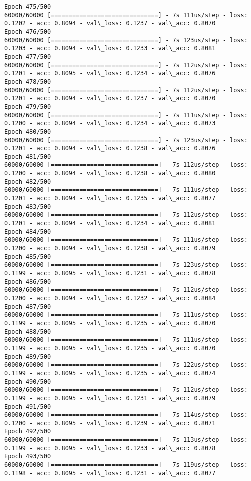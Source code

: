 \documentclass[11pt]{article}
\begin{document}
\begin{Verbatim}[commandchars=\\\{\}]
Epoch 475/500
60000/60000 [==============================] - 7s 111us/step - loss: 0.1202 - acc: 0.8094 - val\_loss: 0.1237 - val\_acc: 0.8070
Epoch 476/500
60000/60000 [==============================] - 7s 123us/step - loss: 0.1203 - acc: 0.8094 - val\_loss: 0.1233 - val\_acc: 0.8081
Epoch 477/500
60000/60000 [==============================] - 7s 112us/step - loss: 0.1201 - acc: 0.8095 - val\_loss: 0.1234 - val\_acc: 0.8076
Epoch 478/500
60000/60000 [==============================] - 7s 112us/step - loss: 0.1201 - acc: 0.8094 - val\_loss: 0.1237 - val\_acc: 0.8070
Epoch 479/500
60000/60000 [==============================] - 7s 111us/step - loss: 0.1200 - acc: 0.8094 - val\_loss: 0.1234 - val\_acc: 0.8073
Epoch 480/500
60000/60000 [==============================] - 7s 123us/step - loss: 0.1201 - acc: 0.8094 - val\_loss: 0.1238 - val\_acc: 0.8076
Epoch 481/500
60000/60000 [==============================] - 7s 112us/step - loss: 0.1200 - acc: 0.8094 - val\_loss: 0.1238 - val\_acc: 0.8080
Epoch 482/500
60000/60000 [==============================] - 7s 111us/step - loss: 0.1201 - acc: 0.8094 - val\_loss: 0.1235 - val\_acc: 0.8077
Epoch 483/500
60000/60000 [==============================] - 7s 112us/step - loss: 0.1201 - acc: 0.8094 - val\_loss: 0.1234 - val\_acc: 0.8081
Epoch 484/500
60000/60000 [==============================] - 7s 111us/step - loss: 0.1200 - acc: 0.8094 - val\_loss: 0.1238 - val\_acc: 0.8079
Epoch 485/500
60000/60000 [==============================] - 7s 123us/step - loss: 0.1199 - acc: 0.8095 - val\_loss: 0.1231 - val\_acc: 0.8078
Epoch 486/500
60000/60000 [==============================] - 7s 112us/step - loss: 0.1200 - acc: 0.8094 - val\_loss: 0.1232 - val\_acc: 0.8084
Epoch 487/500
60000/60000 [==============================] - 7s 111us/step - loss: 0.1199 - acc: 0.8095 - val\_loss: 0.1235 - val\_acc: 0.8070
Epoch 488/500
60000/60000 [==============================] - 7s 111us/step - loss: 0.1199 - acc: 0.8095 - val\_loss: 0.1235 - val\_acc: 0.8070
Epoch 489/500
60000/60000 [==============================] - 7s 122us/step - loss: 0.1199 - acc: 0.8095 - val\_loss: 0.1235 - val\_acc: 0.8074
Epoch 490/500
60000/60000 [==============================] - 7s 112us/step - loss: 0.1199 - acc: 0.8095 - val\_loss: 0.1231 - val\_acc: 0.8079
Epoch 491/500
60000/60000 [==============================] - 7s 114us/step - loss: 0.1200 - acc: 0.8095 - val\_loss: 0.1239 - val\_acc: 0.8071
Epoch 492/500
60000/60000 [==============================] - 7s 113us/step - loss: 0.1199 - acc: 0.8095 - val\_loss: 0.1233 - val\_acc: 0.8078
Epoch 493/500
60000/60000 [==============================] - 7s 119us/step - loss: 0.1198 - acc: 0.8095 - val\_loss: 0.1231 - val\_acc: 0.8077

\end{Verbatim}
\end{document}
